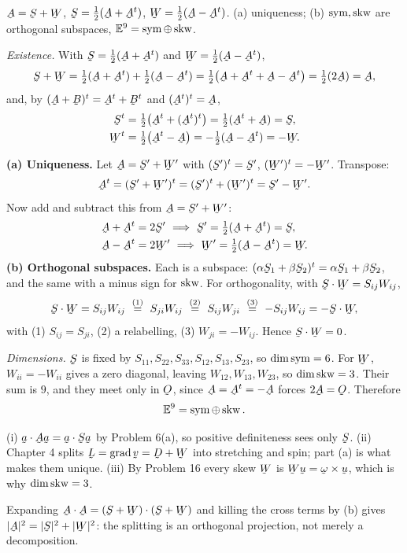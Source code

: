 \begin{problem}
$\bA=\bS+\bW$, $\bS=\tfrac12(\bA+\bA^t)$, $\bW=\tfrac12(\bA-\bA^t)$. (a)
uniqueness; (b) $\operatorname{sym},\operatorname{skw}$ are orthogonal subspaces,
$\mathbb{E}^9=\operatorname{sym}\oplus\operatorname{skw}$.
\end{problem}
\begin{solution}
\emph{Existence.} With $\bS=\tfrac12(\bA+\bA^{t})$ and
$\bW=\tfrac12(\bA-\bA^{t})$,
\[
   \bS+\bW=\tfrac12(\bA+\bA^{t})+\tfrac12(\bA-\bA^{t})
   =\tfrac12\big(\bA+\bA^{t}+\bA-\bA^{t}\big)=\tfrac12(2\bA)=\bA ,
\]
and, by $(\bA+\bB)^{t}=\bA^{t}+\bB^{t}$ and $(\bA^{t})^{t}=\bA$,
\[
\begin{aligned}
   \bS^{t}&=\tfrac12\big(\bA^{t}+(\bA^{t})^{t}\big)
         =\tfrac12(\bA^{t}+\bA)=\bS,\\
   \bW^{t}&=\tfrac12\big(\bA^{t}-\bA\big)
         =-\tfrac12(\bA-\bA^{t})=-\bW .
\end{aligned}
\]

\textbf{(a) Uniqueness.} Let $\bA=\bS'+\bW'$ with $(\bS')^{t}=\bS'$,
$(\bW')^{t}=-\bW'$. Transpose:
\[
   \bA^{t}=(\bS'+\bW')^{t}=(\bS')^{t}+(\bW')^{t}=\bS'-\bW' .
\]
Now add and subtract this from $\bA=\bS'+\bW'$:
\[
\begin{aligned}
   \bA+\bA^{t}&=2\bS'\ \Longrightarrow\ \bS'=\tfrac12(\bA+\bA^{t})=\bS,\\
   \bA-\bA^{t}&=2\bW'\ \Longrightarrow\ \bW'=\tfrac12(\bA-\bA^{t})=\bW .
\end{aligned}
\]
\textbf{(b) Orthogonal subspaces.} Each is a subspace:
$(\alpha\bS_{1}+\beta\bS_{2})^{t}=\alpha\bS_{1}+\beta\bS_{2}$, and the
same with a minus sign for $\operatorname{skw}$. For orthogonality, with
$\bS\cdot\bW=S_{ij}W_{ij}$,
\[
   \bS\cdot\bW=S_{ij}W_{ij}
   \ \overset{(1)}{=}\ S_{ji}W_{ij}
   \ \overset{(2)}{=}\ S_{ij}W_{ji}
   \ \overset{(3)}{=}\ -S_{ij}W_{ij}=-\bS\cdot\bW ,
\]
with (1) $S_{ij}=S_{ji}$, (2) a relabelling, (3) $W_{ji}=-W_{ij}$. Hence
$\bS\cdot\bW=0$.

\emph{Dimensions.} $\bS$ is fixed by
$S_{11},S_{22},S_{33},S_{12},S_{13},S_{23}$, so $\dim\operatorname{sym}=6$. For $\bW$,
$W_{ii}=-W_{ii}$ gives a zero diagonal, leaving
$W_{12},W_{13},W_{23}$, so $\dim\operatorname{skw}=3$. Their sum is $9$, and they meet
only in $\Ob$, since $\bA=\bA^{t}=-\bA$ forces $2\bA=\Ob$. Therefore
\[
   \mathbb{E}^{9}=\operatorname{sym}\oplus\operatorname{skw} .
\]
\end{solution}

\begin{remark}\label{rem:symskwuse}
(i) $\ip{\ba}{\bA\ba}=\ip{\ba}{\bS\ba}$ by Problem 6(a), so positive
definiteness  sees only $\bS$.
(ii) Chapter 4 splits $\bL=\grad\bv=\bD+\bW$ into stretching and spin;
part (a) is what makes them unique.
(iii) By Problem 16 every skew $\bW$ is $\bW\bu=\bom\times\bu$, which is
why $\dim\operatorname{skw}=3$.

Expanding $\bA\cdot\bA=(\bS+\bW)\cdot(\bS+\bW)$ and killing the cross
terms by (b) gives $|\bA|^{2}=|\bS|^{2}+|\bW|^{2}$: the splitting is an
orthogonal projection, not merely a decomposition.
\end{remark}

